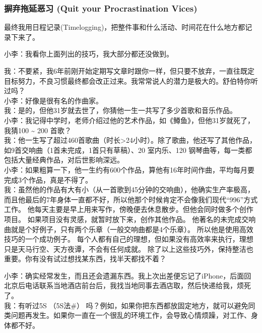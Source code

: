 \hypertarget{ux6839ux56e0ux5206ux6790ux8befux89e3ux6848ux4f8b}{%
\subsubsection{摒弃拖延恶习 (Quit your Procrastination Vices)}\label{ux6839ux56e0ux5206ux6790ux8befux89e3ux6848ux4f8b}}


最终我用日程记录(Timelogging)，把整件事和什么活动、时间花在什么地方都记录下来了。

小李：我看你上面列出的技巧，我大部分都还没做到。

我：不要紧，我6年前刚开始定期写文章时跟你一样，但只要不放弃，一直往既定目标努力，不良习惯最终都会改正过来。我常常说人的潜力是极大的。舒伯特你听过吗？\\
小李：好像是很有名的作曲家。\\
我：是的，但他31岁就去世了，你猜他一生一共写了多少首歌和音乐作品。\\
小李：我记得中学时，老师介绍过他的艺术作品，如《鳟鱼》，但他31岁就死了，我猜100 \textasciitilde{} 200 首歌？\\
我：他一生写了超过460首歌曲（时长\textgreater{}24小时）。除了歌曲，他还写了其他作品，如9首交响曲（1首未完成，1首只有草稿）、20
室内乐、120 钢琴曲等，每一类都包括大量经典作品，对后世影响深远。\\
小李：如果粗算一下，他一生约有600个作品，算他有16年时间作曲，平均每月要完成3个作品，真是不得了。\\
我：虽然他的作品有大有小（从一首歌到45分钟的交响曲），他确实生产率极高，而且他最后的7年身体一直都不好，所以他那个时候肯定不会像我们现代“996”方式工作。
他每天主要是早上用来写作，傍晚便去休息散步。但他会同时做多个创作项目。
如果项目没有灵感，就暂时放下来，创作其他作品。
他著名的未完成交响曲就是个好例子，只有两个乐章（一般交响曲都是4个乐章）。
所以他是使用高效技巧的一个成功例子。
每个人都有自己的理想，但如果没有高效率来执行，理想只是天马行空、天方夜谭，不会有任何成就。
除了以上这些技巧外，保持整洁也重要。你有没有试过想找某东西，找半天都找不着？

小李：确实经常发生，而且还会遗漏东西。我上次出差便忘记了iPhone，后面回北京后电话联系当地酒店前台后，我找当地同事去酒店取，然后快递给我，烦死了。\\
我：有听过5S （5S法\#）
吗？例如，如果你把东西都放固定地方，就可以避免同类问题再发生。如果你一直在一个很乱的环境工作，会导致心情烦躁，对工作、身体都不好。

